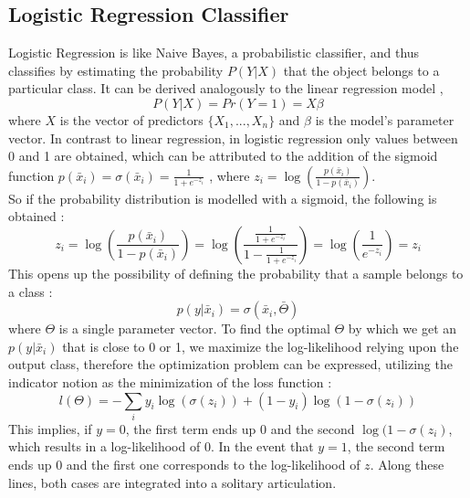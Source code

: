 \documentclass[a4paper, 11pt,titlepage,oneside,openany]{book}
\begin{document}
\subsection{Logistic Regression Classifier}
\noindent Logistic Regression is like Naive Bayes, a probabilistic classifier, and thus classifies by estimating the probability $P(Y|X)$ that the object belongs to a particular class.
It can be derived analogously to the linear regression model \cite{logisticregressionbook}, 
\[
P(Y|X)=Pr(Y=1)=X\beta
\]
where $X$ is the vector of predictors $\{X_1,...,X_n\}$ and $\beta$ is the model's parameter vector. In contrast to linear regression, in logistic regression only values between 0 and 1 are obtained, which can be attributed to the addition of the sigmoid function $p(\bar{x}_i)=\sigma(\bar{x}_i)=\frac{1}{1+e^{-z_i}}$ \cite{algorithms2}, where $z_i=\log(\frac{p(\bar{x}_i)}{1-p(\bar{x}_i)})$. \\
So if the probability distribution is modelled with a sigmoid, the following is obtained \cite{algorithms2}:
\[
z_i=\log(\frac{p(\bar{x}_i)}{1-p(\bar{x}_i)})=\log(\frac{\frac{1}{1+e^{-z_i}}}{1-\frac{1}{1+e^{-z_i}}})=\log(\frac{1}{e^{-z_i}})=z_i
\]
This opens up the possibility of defining the probability that a sample belongs to a class \cite{algorithms2}:
\[
p(y|\bar{x}_i)=\sigma(\bar{x}_i,\bar{\Theta})
\]
where $\Theta$ is a single parameter vector.
\noindent To find the optimal $\Theta$ by which we get an $p(y|\bar{x}_i)$ that is close to 0 or 1, we maximize the log-likelihood relying upon the output class, therefore the optimization problem can be expressed, utilizing the indicator notion as the minimization of the loss function \cite{algorithms}:
\[
l(\Theta)=-\sum_{i}y_i\log(\sigma(z_i))+(1-y_i)\log(1-\sigma(z_i))
\]
\noindent This implies, if $y=0$, the first term ends up $0$ and the second $\log(1-\sigma(z_i)$, which results in a log-likelihood of $0$. In the event that $y=1$, the second term ends up 0 and the first one corresponds to the log-likelihood of $z$. Along these lines, both cases are integrated into a solitary articulation. \\
\end{document}
